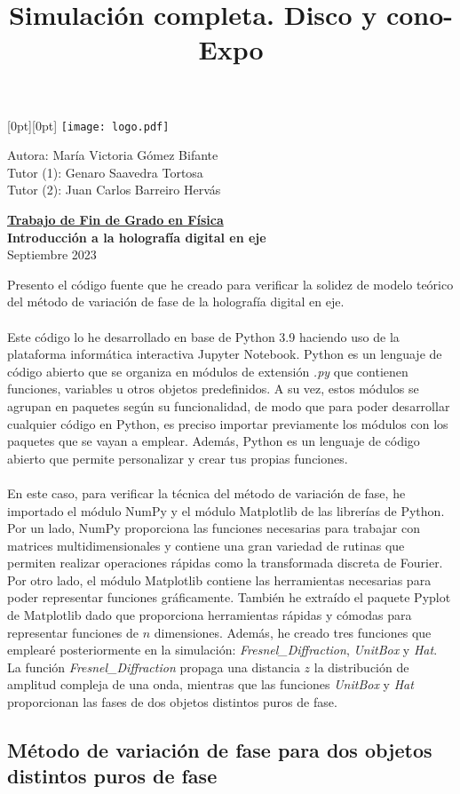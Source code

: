 \documentclass[11pt]{article}
\title{Simulación completa. Disco y cono-Expo}
\begin{document}
\noindent\raisebox{0pt}[0pt][0pt]{
\texttt{[image: logo.pdf]}}\par
\vspace{0.5cm}
Autora: María Victoria Gómez Bifante\\
Tutor (1): Genaro Saavedra Tortosa\\
Tutor (2): Juan Carlos Barreiro Hervás
\vspace{0.75cm}
\begin{center} 
  \Large{\textbf{\underline{Trabajo de Fin de Grado en Física}}}\\
  \vspace{0.15cm}
  \Large{\textbf{Introducción a la holografía digital en eje}} \\
  \vspace{0.25cm}
  \large{Septiembre 2023}
\end{center}
\vspace{0.75cm}
Presento el código fuente que he creado para verificar la solidez de modelo teórico del método de variación de fase de la holografía digital en eje.  \\ \\
Este código lo he desarrollado en base de Python 3.9 haciendo uso de la plataforma informática interactiva Jupyter Notebook. Python es un lenguaje de código abierto que se organiza en módulos de extensión \textit{.py} que contienen funciones, variables u otros objetos predefinidos. A su vez, estos módulos se agrupan en paquetes según su funcionalidad, de modo que para poder desarrollar cualquier código en Python, es preciso importar previamente los módulos con los paquetes que se vayan a emplear. Además, Python es un lenguaje de código abierto que permite personalizar y crear tus propias funciones.\\ \\
En este caso, para verificar la técnica del método de variación de fase, he importado  el módulo NumPy y el módulo Matplotlib de las librerías de Python. Por un lado, NumPy proporciona las funciones necesarias para trabajar con matrices multidimensionales y contiene una gran variedad de rutinas que permiten realizar operaciones rápidas como la transformada discreta de Fourier. Por otro lado, el módulo Matplotlib contiene las herramientas necesarias para poder representar funciones gráficamente. También he extraído el paquete Pyplot de Matplotlib dado que proporciona herramientas rápidas y cómodas para representar funciones de $n$ dimensiones. Además, he creado tres funciones  que emplearé posteriormente en la simulación:  \textit{Fresnel\_Diffraction},  \textit{UnitBox} y \textit{Hat}. La función \textit{Fresnel\_Diffraction}  propaga una distancia $z$ la distribución de amplitud compleja de una onda, mientras que las funciones \textit{UnitBox} y \textit{Hat} proporcionan las fases de dos objetos distintos puros de fase.
\hypertarget{muxe9todo-de-variaciuxf3n-de-fase-para-dos-objetos-distintos-puros-de-fase}{%
\subsection*{Método de variación de fase para dos objetos distintos puros de
fase}\label{muxe9todo-de-variaciuxf3n-de-fase-para-dos-objetos-distintos-puros-de-fase}}
\end{document}

